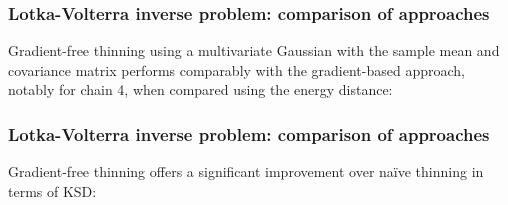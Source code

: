 \documentclass{beamer}
\begin{document}
\begin{frame}
\frametitle{Lotka-Volterra inverse problem: comparison of approaches}

Gradient-free thinning using a multivariate Gaussian with the sample mean and covariance matrix performs comparably with the gradient-based approach, notably for chain 4, when compared using the energy distance:

\begin{figure}[h]
\centering
{}
\end{figure}

\end{frame}

\begin{frame}
\frametitle{Lotka-Volterra inverse problem: comparison of approaches}

Gradient-free thinning offers a significant improvement over na\"ive thinning in terms of KSD:

\begin{figure}[h]
\centering
{}
\end{figure}

\end{frame}
\end{document}
